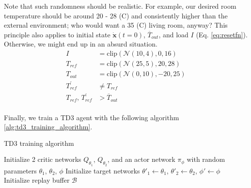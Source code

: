 \documentclass[../main.tex]{subfiles}
\begin{document}
Note that such randomness should be realistic. For example, our desired room temperature should be around 20 - 28 (\degree C) and consistently higher than the external environment; who would want a 35 (\degree C) living room, anyway? This principle also applies to initial state $\mathbf{\dot{x}}(t=0)$, $\overline{T}_{out}$, and load $I$ (Eq. \ref{eq:resetfn}). Otherwise, we might end up in an absurd situation.
\begin{equation}
\begin{aligned}
    I &= \text{clip} \left( \mathcal{N}(10,4), 0, 16 \right) \\
    T_{ref} &= \text{clip} \left( \mathcal{N}(25,5), 20, 28 \right) \\
    T_{out} &= \text{clip} \left( \mathcal{N}(0,10), -20, 25 \right) \\
    T^{\prime}_{ref} &\neq T_{ref} \\
    T_{ref}, \, T^{\prime}_{ref} &> \overline{T}_{out} \\
\end{aligned}
\label{eq:resetfn}
\end{equation}

Finally, we train a TD3 agent with the following algorithm \ref{alg:td3_training_algorithm}.

\begin{algorithm}[htbp]
\caption{TD3 training algorithm}
\label{alg:td3_training_algorithm}
\SetAlgoLined
Initialize 2 critic networks $Q_{\theta_1}$, $Q_{\theta_2}$, and an actor network $\pi_{\phi}$ with random parameters $\theta_1$, $\theta_2$, $\phi$\;
Initialize target networks $\theta'_1 \leftarrow \theta_1$, $\theta'_2 \leftarrow \theta_2$, $\phi' \leftarrow \phi$\;
Initialize replay buffer $\mathcal{B}$\;
\BlankLine
{}
\end{algorithm}
\end{document}
